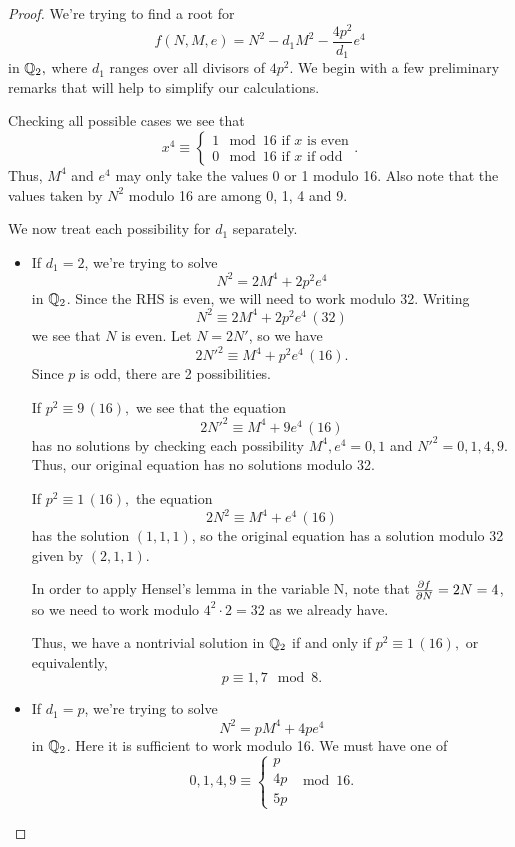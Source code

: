 \documentclass[12pt, a4paper]{report}
\begin{document}
\begin{proof}
  We're trying to find a root for
  \[f(N,M,e) = N^2 - d_1M^2 - \frac{4p^2}{d_1}e^4\]
  in ${\mathbb Q}_2,$
  where $d_1$ ranges over all divisors of $4p^2$.
  We begin with a few preliminary remarks that will help to 
  simplify our calculations.
 
  Checking all possible cases we see that
  \[x^4 \equiv
    \begin{cases}
      1 \mod{16} \text{ if } x \text{ is even} \\
      0 \mod{16} \text{ if } x \text{ if odd}
    \end{cases}.
  \]
  Thus, $M^4$ and $e^4$ may only take the values 0 or 1 modulo 16.
  Also note that the values taken by $N^2$ modulo 16 are among 0, 1, 4 and 9.
 
  We now treat each possibility for $d_1$ separately.
  
  \begin{itemize}
  \item If $d_1 = 2$, we're trying to solve
    \[N^2 = 2M^4 + 2p^2e^4 \] in ${\mathbb Q}_2$. 
    Since the RHS is even, we will need
    to work modulo 32. Writing
    \[N^2 \equiv 2M^4 + 2p^2e^4 \, (32)\]
    we see that $N$ is even. Let $N = 2N'$, so we have
    \[2N'^2 \equiv M^4 + p^2e^4 \, (16).\]
    Since $p$ is odd, there are 2 possibilities.

    If $p^2 \equiv 9 \, (16),$ we see that the equation
    \[2N'^2 \equiv M^4 + 9e^4 \, (16)\]
    has no solutions by checking each possibility $M^4, e^4 = 0, 1$ and
    $N'^2 = 0, 1, 4, 9$. Thus, our original equation has no solutions modulo 32.

    If $p^2 \equiv 1 \, (16),$ the equation
    \[2N^2 \equiv M^4 + e^4 \, (16)\]
    has the solution $(1,1,1)$, so the original equation has a solution modulo
    32 given by $(2,1,1).$

    In order to apply Hensel's lemma in the variable N, note that
    $\frac{\partial f}{\partial N} = 2N = 4$, so we need to work modulo $4^2 \cdot 2 = 32$ as
    we already have.

    Thus, we have a nontrivial solution in ${\mathbb Q}_2$ if and only if $p^2 \equiv 1
    \, (16),$ or equivalently,
    \[p \equiv 1, 7 \mod{8}.\]
    
    \item If $d_1 = p$, we're trying to solve
    \[N^2 = pM^4 + 4pe^4 \] in ${\mathbb Q}_2$. Here it is sufficient to work modulo 16.
    We must have one of
    \[0, 1, 4, 9 \equiv
      \begin{cases}
        p \\
        4p \\
        5p
      \end{cases} \mod{16}.
    \]


\end{itemize}
\end{proof}
\end{document}
